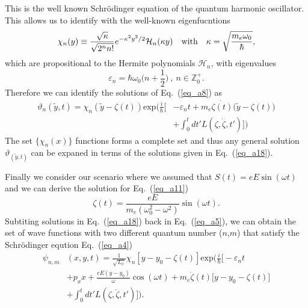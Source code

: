 This is the well known Schrödinger equation of the quantum harmonic oscillator.
This allows us to identify with the well-known eigenfucntions \cite{griffiths18,shankar94}
\begin{equation} \label{eq_a16}
  \chi_n(y) \equiv
   \frac{\sqrt{\kappa}}{\sqrt{2^{n}n!}}
  e^{-\kappa^2 y^2/2}
  \mathcal{H}_n \qty(\kappa y) \quad \text{with}
  \quad
  \kappa = \sqrt{\frac{m_e \omega_0}{\hbar}},
\end{equation}
which are propositional to the Hermite polynomials $\mathcal{H}_n$, with eigenvalues
\begin{equation} \label{eq_a17}
  \varepsilon_n = \hbar \omega_0 \big(n + \frac{1}{2}\big)
  ~,~
  n \in \mathbb{Z}^{+}_0.
\end{equation}
Therefore we can identify the solutions of Eq.~(\ref{eq_a8}) as
\begin{equation} \label{eq_a18}
  \begin{aligned}
    \vartheta_n(\tilde{y},t) = \chi_n(\tilde{y} - \zeta(t))
     \text{exp}\bigg(\frac{i}{\hbar}\bigg[&- \varepsilon_nt +
    m_e\dot{\zeta(t)}\big(\tilde{y}-\zeta(t)\big) \\
     & + \int_0^{t}dt'L(\zeta,\dot{\zeta},t')\bigg]\bigg)
  \end{aligned}
\end{equation}
The set $\{\chi_n(x)\}$ functions forms a complete set and thus any general solution $\vartheta_(\tilde{y},t)$ can be expaned in terms of the solutions given in Eq.~(\ref{eq_a18}).

Finally we consider our scenario where we assumed that $S(t) = eE\sin(\omega t)$ and we can derive the solution for Eq.~(\ref{eq_a11})
\begin{equation} \label{eq_a19}
  \zeta(t) = \frac{eE}{m_e(\omega_0^2 - \omega^2)}\sin(\omega t).
\end{equation}
Subtiting solutions in Eq.~(\ref{eq_a18}) back in Eq.~(\ref{eq_a5}), we can obtain the set of wave functions with two different quantum number ($n$,$m$) that satisfy the Schrödinger eqution Eq.~(\ref{eq_a4})
\begin{equation} \label{eq_a20}
  \begin{aligned}
    \psi_{n,m}&(x,y,t)  = \frac{1}{\sqrt{L_x}}
    \chi_n\left[y - y_0 - \zeta(t)\right]
    \text{exp}\bigg(
    \frac{i}{\hbar}\bigg[- \varepsilon_nt \\
    &
    + p_x x + \frac{eE(y - y_0)}{\omega}\cos(\omega t)+
    m_e\dot{\zeta}(t)\big[y - y_0 -\zeta(t)\big]\\
    & +
    \int_0^{t}dt'L(\zeta,\dot{\zeta},t')\bigg]\bigg).
  \end{aligned}
\end{equation}
